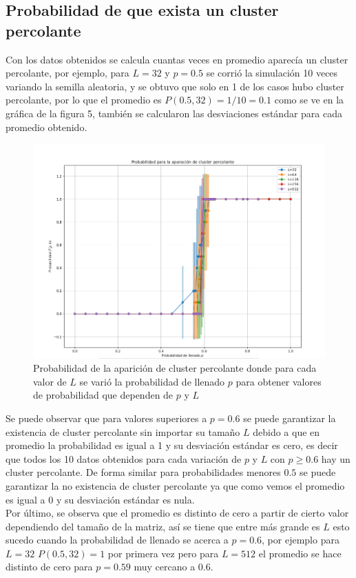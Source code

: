 \documentclass[11pt,twocolumn]{article}
\begin{document}
\subsection{\textbf{Probabilidad de que exista un cluster percolante}}
Con los datos obtenidos se calcula cuantas veces en promedio aparecía un cluster percolante, por ejemplo, para $L=32$ y $p=0.5$ se corrió la simulación 10 veces variando la semilla aleatoria, y se obtuvo que solo en 1 de los casos hubo cluster percolante, por lo que el promedio es $P(0.5,32)=1/10=0.1$ como se ve en la gráfica de la figura 5, también se calcularon las desviaciones estándar para cada promedio obtenido.
\begin{figure}[H]
    \centering
    \includegraphics[scale=0.35]{Imagenes/Probabilidad.png}
    \caption{Probabilidad de la aparición de cluster percolante donde para cada valor de $L$ se varió la probabilidad de llenado $p$ para obtener valores de probabilidad que dependen de $p$ y $L$}
    \label{Promedio}
\end{figure}

Se puede observar que para valores superiores a $p=0.6$ se puede garantizar la existencia de cluster percolante sin importar su tamaño $L$ debido a que en promedio la probabilidad es igual a 1 y su desviación estándar es cero, es decir que todos los 10 datos obtenidos para cada variación de $p$ y $L$ con $p\geq0.6$ hay un cluster percolante. De forma similar para probabilidades menores $0.5$ se puede garantizar la no existencia de cluster percolante ya que como vemos el promedio es igual a 0 y su desviación estándar es nula.\\
Por último, se observa que el promedio es distinto de cero a partir de cierto valor dependiendo del tamaño de la matriz, así se tiene que entre más grande es $L$ esto sucedo cuando la probabilidad de llenado se acerca a $p=0.6$, por ejemplo para $L=32$ $P(0.5,32)=1$ por primera vez pero para $L=512$ el promedio se hace distinto de cero para $p=0.59$ muy cercano a $0.6$.
\end{document}
